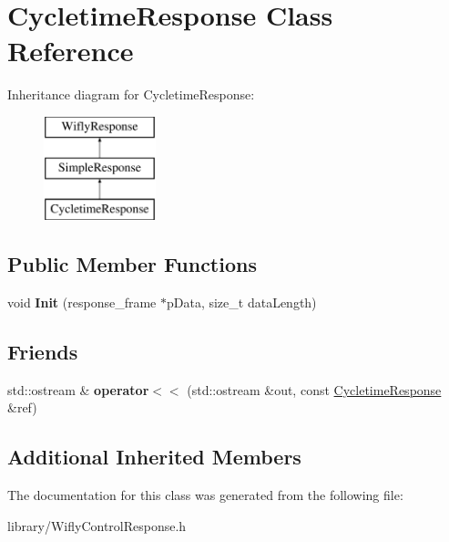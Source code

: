 \hypertarget{class_cycletime_response}{\section{Cycletime\-Response Class Reference}
\label{class_cycletime_response}
}
Inheritance diagram for Cycletime\-Response\-:\begin{figure}[H]
\begin{center}
\leavevmode
\includegraphics[height=3.000000cm]{class_cycletime_response}
\end{center}
\end{figure}
\subsection*{Public Member Functions}
\begin{DoxyCompactItemize}
\item 
\hypertarget{class_cycletime_response_ada97d2caf35ad02157828780c66bbaf4}{void {\bfseries Init} (response\-\_\-frame $\ast$p\-Data, size\-\_\-t data\-Length)}\label{class_cycletime_response_ada97d2caf35ad02157828780c66bbaf4}

\end{DoxyCompactItemize}
\subsection*{Friends}
\begin{DoxyCompactItemize}
\item 
\hypertarget{class_cycletime_response_a297451ca9509cdee481811027a5e31a6}{std\-::ostream \& {\bfseries operator$<$$<$} (std\-::ostream \&out, const \hyperlink{class_cycletime_response}{Cycletime\-Response} \&ref)}\label{class_cycletime_response_a297451ca9509cdee481811027a5e31a6}

\end{DoxyCompactItemize}
\subsection*{Additional Inherited Members}


The documentation for this class was generated from the following file\-:\begin{DoxyCompactItemize}
\item 
library/Wifly\-Control\-Response.\-h\end{DoxyCompactItemize}
